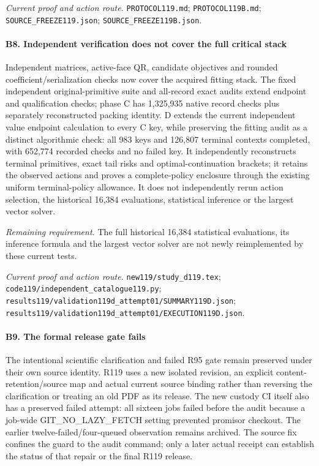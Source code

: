 \par\emph{Current proof and action route.} \nolinkurl{PROTOCOL119.md}; \nolinkurl{PROTOCOL119B.md}; \nolinkurl{SOURCE_FREEZE119.json}; \nolinkurl{SOURCE_FREEZE119B.json}.

\paragraph{B8. Independent verification does not cover the full critical stack}

Independent matrices, active-face QR, candidate objectives and rounded coefficient/\allowbreak{}serialization checks now cover the acquired fitting stack. The fixed independent original-primitive suite and all-record exact audits extend endpoint and qualification checks; phase C has 1,325,935 native record checks plus separately reconstructed packing identity. D extends the current independent value endpoint calculation to every C key, while preserving the fitting audit as a distinct algorithmic check: all 983 keys and 126,807 terminal contexts completed, with 652,774 recorded checks and no failed key. It independently reconstructs terminal primitives, exact tail risks and optimal-continuation brackets; it retains the observed actions and proves a complete-policy enclosure through the existing uniform terminal-policy allowance. It does not independently rerun action selection, the historical 16,384 evaluations, statistical inference or the largest vector solver.

\par\emph{Remaining requirement.} The full historical 16,384 statistical evaluations, its inference formula and the largest vector solver are not newly reimplemented by these current tests.

\par\emph{Current proof and action route.} \nolinkurl{new119/study_d119.tex}; \nolinkurl{code119/independent_catalogue119.py}; \nolinkurl{results119/validation119d_attempt01/SUMMARY119D.json}; \nolinkurl{results119/validation119d_attempt01/EXECUTION119D.json}.

\paragraph{B9. The formal release gate fails}

The intentional scientific clarification and failed R95 gate remain preserved under their own source identity. R119 uses a new isolated revision, an explicit content-retention/\allowbreak{}source map and actual current source binding rather than reversing the clarification or treating an old PDF as its release. The new custody CI itself also has a preserved failed attempt: all sixteen jobs failed before the audit because a job-wide GIT\_NO\_LAZY\_FETCH setting prevented promisor checkout. The earlier twelve-failed/\allowbreak{}four-queued observation remains archived. The source fix confines the guard to the audit command; only a later actual receipt can establish the status of that repair or the final R119 release.

